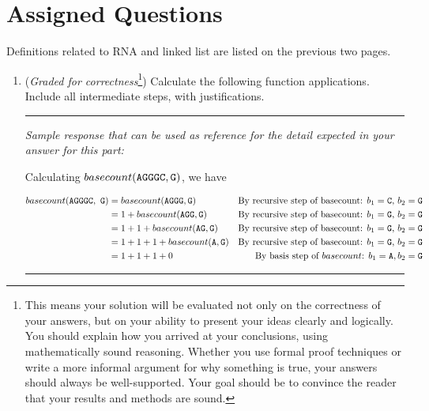 \documentclass[12pt, oneside]{article}
\begin{document}
\newpage

\section*{Assigned Questions}
Definitions related to RNA and linked list are listed on the previous two pages.
\begin{enumerate}



\item ({\it Graded for correctness}\footnote{This means your solution will be
evaluated not only on the correctness of your answers, but on your ability to 
present your ideas clearly and logically. You should explain how you arrived at your conclusions, using 
mathematically sound reasoning. Whether you use formal proof techniques or write a more informal argument for why 
something is true, your answers should always be well-supported. Your goal should be to convince the reader that 
your results and methods are sound.}) Calculate the following function applications. Include all intermediate steps, with 
justifications.


\rule{0.5\textwidth}{.4pt}

{\it Sample response that can be used as reference for the detail expected 
in your answer for this part:} 

Calculating $basecount(\texttt{A}\texttt{G}\texttt{G}\texttt{G}\texttt{C}, \texttt{G} )$, we have

\begin{alignat*}{2}
basecount  (\texttt{A}\texttt{G}\texttt{G}\texttt{G}\texttt{C},~\texttt{G}) 
&= basecount(\texttt{A}\texttt{G}\texttt{G}\texttt{G}, \texttt{G}) & \text{By recursive step of basecount: $b_1 =\texttt{C}$, $b_2 = \texttt{G}$}\\
&= 1 + basecount(\texttt{A}\texttt{G}\texttt{G}, \texttt{G}) & \text{By recursive step of basecount: $b_1 =\texttt{G}$, $b_2 = \texttt{G}$}\\
&= 1 + 1 + basecount(\texttt{A}\texttt{G}, \texttt{G}) & \text{By recursive step of basecount: $b_1 =\texttt{G}$, $b_2 = \texttt{G}$}\\
&= 1 + 1 + 1 + basecount(\texttt{A}, \texttt{G}) & \text{By recursive step of basecount: $b_1 =\texttt{G}$, $b_2 = \texttt{G}$}\\
&= 1 + 1 + 1 + 0 & \text{By basis step of $basecount$:  $b_1 = \texttt{A}, b_2 = \texttt{G}$}
\end{alignat*}
\rule{0.5\textwidth}{.4pt}


\end{enumerate}
\end{document}
